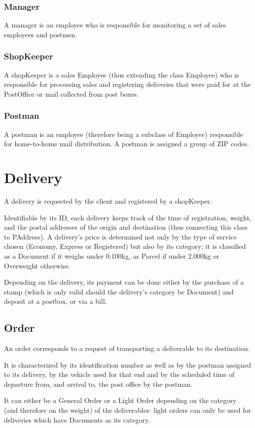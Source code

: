 \documentclass{article}[a4paper]
\theoremstyle{remark}
\begin{document}
\subsubsection{Manager}
A manager is an employee who is responsible for monitoring a set of sales employees and postmen.
\subsubsection{ShopKeeper}
A shopKeeper is a sales Employee (thus extending the class Employee) who is responsible for processing sales and registering deliveries that were paid for at the PostOffice or mail collected from post boxes.
\subsubsection{Postman}
A postman is an employee (therefore being a subclass of Employee) responsible for home-to-home mail distribution. A postman is assigned a group of ZIP codes.
\section{Delivery}
A delivery is requested by the client and registered by a shopKeeper. \par
Identifiable by its ID, each delivery keeps track of the time of registration, weight, and the postal addresses of the origin and destination (thus connecting this class to PAddress). A delivery’s price is determined not only by the type of service chosen (Economy, Express or Registered) but also by its category; it is classified as a Document if it weighs under 0.100kg, as Parcel if under 2.000kg or Overweight otherwise.\par
Depending on the delivery, its payment can be done either by the purchase of a stamp (which is only valid should the delivery’s category be Document) and deposit at a postbox, or via a bill.
\subsection{Order}
An order corresponds to a request of transporting a deliverable to its destination.\par
It is characterized by its identification number as well as by the postman assigned to its delivery, by the vehicle used for that end and by the scheduled time of departure from, and arrival to, the post office by the postman.\par
It can either be a General Order or a Light Order depending on the category (and therefore on the weight) of the deliverables: light orders can only be used for deliveries which have Documents as its category.
\end{document}
